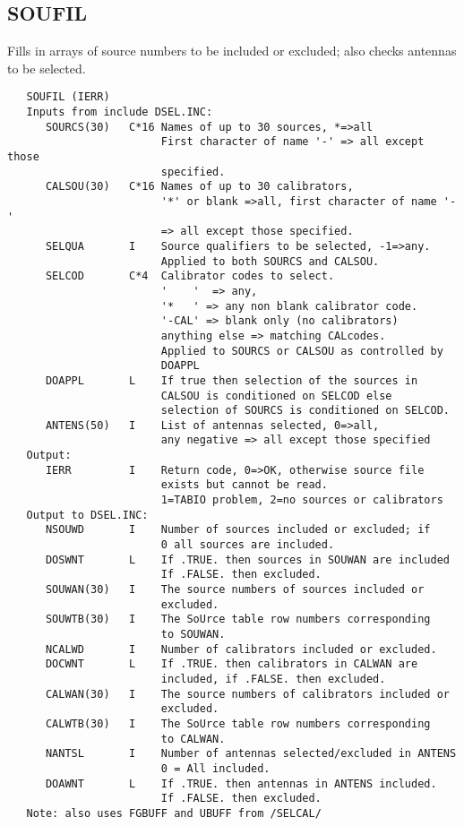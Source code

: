 \subsection{SOUFIL}
Fills in arrays of source numbers to be included or excluded; also
checks antennas to be selected.
\begin{verbatim}
   SOUFIL (IERR)
   Inputs from include DSEL.INC:
      SOURCS(30)   C*16 Names of up to 30 sources, *=>all
                        First character of name '-' => all except those
                        specified.
      CALSOU(30)   C*16 Names of up to 30 calibrators,
                        '*' or blank =>all, first character of name '-'
                        => all except those specified.
      SELQUA       I    Source qualifiers to be selected, -1=>any.
                        Applied to both SOURCS and CALSOU.
      SELCOD       C*4  Calibrator codes to select.
                        '    '  => any,
                        '*   ' => any non blank calibrator code.
                        '-CAL' => blank only (no calibrators)
                        anything else => matching CALcodes.
                        Applied to SOURCS or CALSOU as controlled by
                        DOAPPL
      DOAPPL       L    If true then selection of the sources in
                        CALSOU is conditioned on SELCOD else
                        selection of SOURCS is conditioned on SELCOD.
      ANTENS(50)   I    List of antennas selected, 0=>all,
                        any negative => all except those specified
   Output:
      IERR         I    Return code, 0=>OK, otherwise source file
                        exists but cannot be read.
                        1=TABIO problem, 2=no sources or calibrators
   Output to DSEL.INC:
      NSOUWD       I    Number of sources included or excluded; if
                        0 all sources are included.
      DOSWNT       L    If .TRUE. then sources in SOUWAN are included
                        If .FALSE. then excluded.
      SOUWAN(30)   I    The source numbers of sources included or
                        excluded.
      SOUWTB(30)   I    The SoUrce table row numbers corresponding
                        to SOUWAN.
      NCALWD       I    Number of calibrators included or excluded.
      DOCWNT       L    If .TRUE. then calibrators in CALWAN are
                        included, if .FALSE. then excluded.
      CALWAN(30)   I    The source numbers of calibrators included or
                        excluded.
      CALWTB(30)   I    The SoUrce table row numbers corresponding
                        to CALWAN.
      NANTSL       I    Number of antennas selected/excluded in ANTENS
                        0 = All included.
      DOAWNT       L    If .TRUE. then antennas in ANTENS included.
                        If .FALSE. then excluded.
   Note: also uses FGBUFF and UBUFF from /SELCAL/
\end{verbatim}

